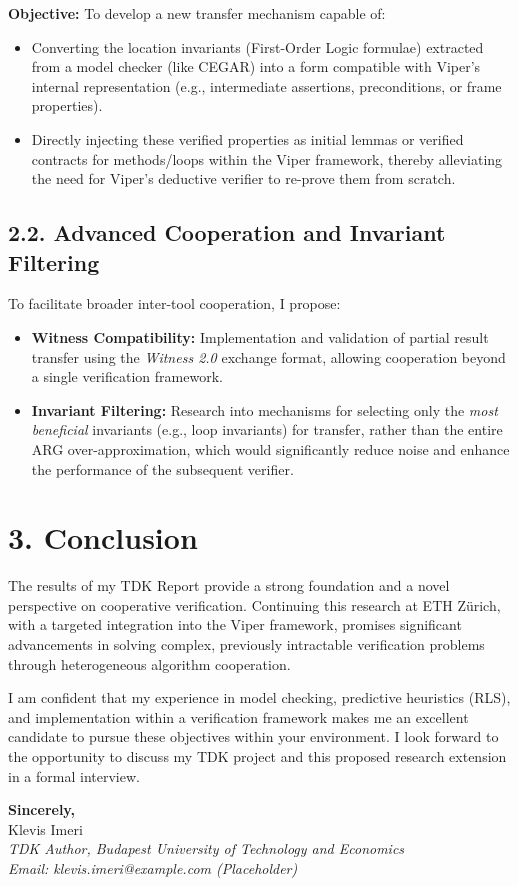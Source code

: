 \documentclass[11pt, a4paper]{article}
\begin{document}
\textbf{Objective:} To develop a new transfer mechanism capable of:
\begin{itemize}
    \item Converting the location invariants (First-Order Logic formulae) extracted from a model checker (like CEGAR) into a form compatible with Viper's internal representation (e.g., intermediate assertions, preconditions, or frame properties).
    \item Directly injecting these verified properties as initial lemmas or verified contracts for methods/loops within the Viper framework, thereby alleviating the need for Viper's deductive verifier to re-prove them from scratch.
\end{itemize}

\subsection*{2.2. Advanced Cooperation and Invariant Filtering}

To facilitate broader inter-tool cooperation, I propose:

\begin{itemize}
    \item \textbf{Witness Compatibility:} Implementation and validation of partial result transfer using the \textit{Witness 2.0} exchange format, allowing cooperation beyond a single verification framework.
    \item \textbf{Invariant Filtering:} Research into mechanisms for selecting only the \textit{most beneficial} invariants (e.g., loop invariants) for transfer, rather than the entire ARG over-approximation, which would significantly reduce noise and enhance the performance of the subsequent verifier.
\end{itemize}

\section*{3. Conclusion}

The results of my TDK Report provide a strong foundation and a novel perspective on cooperative verification. Continuing this research at ETH Zürich, with a targeted integration into the Viper framework, promises significant advancements in solving complex, previously intractable verification problems through heterogeneous algorithm cooperation.

I am confident that my experience in model checking, predictive heuristics (RLS), and implementation within a verification framework makes me an excellent candidate to pursue these objectives within your environment. I look forward to the opportunity to discuss my TDK project and this proposed research extension in a formal interview.

\vspace{2em}
\textbf{Sincerely,} \\
\vspace{0.5em}
Klevis Imeri \\
\textit{TDK Author, Budapest University of Technology and Economics} \\
\textit{Email: klevis.imeri@example.com (Placeholder)}
\end{document}
